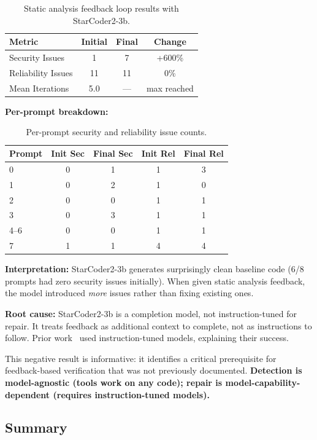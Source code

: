 \begin{table}[h]
\centering
\begin{tabular}{lccc}
\toprule
Metric & Initial & Final & Change \\
\midrule
Security Issues & 1 & 7 & +600\% \\
Reliability Issues & 11 & 11 & 0\% \\
Mean Iterations & 5.0 & --- & max reached \\
\bottomrule
\end{tabular}
\caption{Static analysis feedback loop results with StarCoder2-3b.}
\label{tab:static}
\end{table}

\textbf{Per-prompt breakdown:}

\begin{table}[h]
\centering
\begin{tabular}{lcccc}
\toprule
Prompt & Init Sec & Final Sec & Init Rel & Final Rel \\
\midrule
0 & 0 & 1 & 1 & 3 \\
1 & 0 & 2 & 1 & 0 \\
2 & 0 & 0 & 1 & 1 \\
3 & 0 & 3 & 1 & 1 \\
4--6 & 0 & 0 & 1 & 1 \\
7 & 1 & 1 & 4 & 4 \\
\bottomrule
\end{tabular}
\caption{Per-prompt security and reliability issue counts.}
\label{tab:perprompt}
\end{table}

\textbf{Interpretation:} StarCoder2-3b generates surprisingly clean baseline code (6/8 prompts had zero security issues initially). When given static analysis feedback, the model introduced \emph{more} issues rather than fixing existing ones.

\textbf{Root cause:} StarCoder2-3b is a completion model, not instruction-tuned for repair. It treats feedback as additional context to complete, not as instructions to follow. Prior work~\cite{blyth2025static} used instruction-tuned models, explaining their success.

This negative result is informative: it identifies a critical prerequisite for feedback-based verification that was not previously documented. \textbf{Detection is model-agnostic (tools work on any code); repair is model-capability-dependent (requires instruction-tuned models).}

\subsection{Summary}

